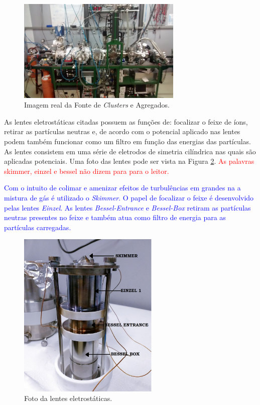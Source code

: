 \begin{figure}
  \centering
  \includegraphics[width=0.7\textwidth]{images/foca/foto_foca}
  \caption{ Imagem real da  Fonte de \textit{Clusters} e Agregados.  }
  \label{fig:foto_foca}
\end{figure}



As lentes eletrostáticas citadas possuem as funções de: focalizar o feixe de íons, retirar as partículas neutras e, de acordo com o potencial aplicado nas lentes podem também funcionar como um filtro em função das energias das partículas. As lentes consistem em uma série de eletrodos de simetria cilíndrica nas quais são aplicadas potenciais. Uma foto das lentes pode ser vista na Figura \ref{fig:foto_lentes}. \textcolor{red}{As palavras skimmer, einzel e bessel não dizem para para o leitor.}

\textcolor{blue}{Com o intuito de colimar e amenizar efeitos de turbulências em grandes na a mistura de gás é utilizado o \textit{Skimmer}. O papel de focalizar o feixe é desenvolvido pelas lentes \textit{Einzel}. As lentes \textit{Bessel-Entrance} e \textit{Bessel-Box} retiram as partículas neutras presentes no feixe e também
atua como filtro de energia para as partículas carregadas.} 

\begin{figure}
  \centering
  \includegraphics[width=0.6\textwidth]{images/foca/lentes}
  \caption{ Foto da lentes eletrostáticas.  }
  \label{fig:foto_lentes}
\end{figure}


